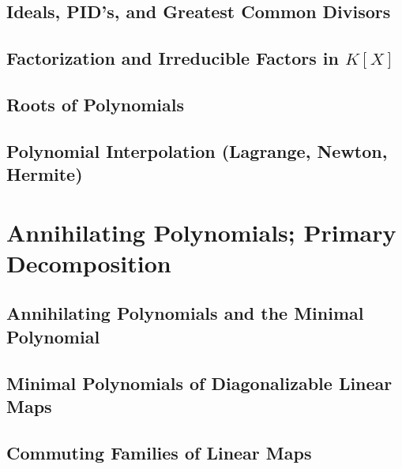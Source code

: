 \documentclass[a4paper]{article}
\begin{document}
\subsection{ Ideals, PID's, and Greatest Common Divisors} %

\subsection{ Factorization and Irreducible Factors in $K[X]$} %

\subsection{ Roots of Polynomials} %

\subsection{ Polynomial Interpolation (Lagrange, Newton, Hermite)} %


\newpage
\section{Annihilating Polynomials; Primary Decomposition}
\subsection{ Annihilating Polynomials and the Minimal Polynomial} %

\subsection{ Minimal Polynomials of Diagonalizable Linear Maps} %

\subsection{ Commuting Families of Linear Maps} %
\end{document}
